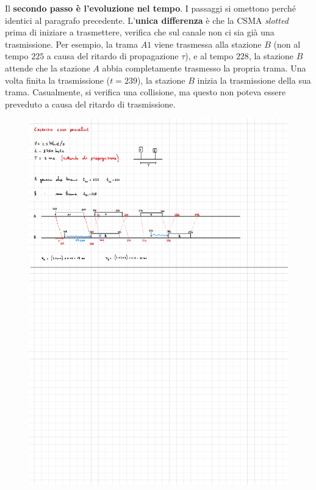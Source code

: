 \documentclass[a4paper]{article}
\begin{document}
	\noindent
	Il \textbf{secondo passo è l'evoluzione nel tempo}. I passaggi si omettono perché identici al paragrafo precedente. L'\textbf{unica differenza} è che la CSMA \emph{slotted} prima di iniziare a trasmettere, verifica che sul canale non ci sia già una trasmissione.\newline
	Per esempio, la trama $A1$ viene trasmessa alla stazione $B$ (non al tempo $225$ a causa del ritardo di propagazione $\tau$), e al tempo $228$, la stazione $B$ attende che la stazione $A$ abbia completamente trasmesso la propria trama. Una volta finita la trasmissione ($t = 239$), la stazione $B$ inizia la trasmissione della sua trama. Casualmente, si verifica una collisione, ma questo non poteva essere preveduto a causa del ritardo di trasmissione.
	\begin{figure}[!htp]
		\centering
		\includegraphics[width=\textwidth]{img/ex1_CSMA-slotted.pdf}
	\end{figure}
	
\end{document}
